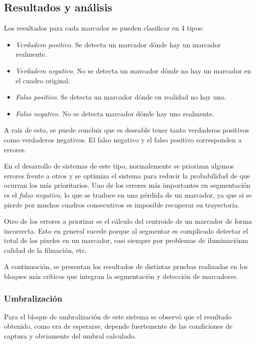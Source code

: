 \subsection{Resultados y análisis}
\label{resultadosyanalisissegmentacion}
Los resultados para cada marcador se pueden clasificar en 4 tipos:
\begin{itemize}
\item \textit{Verdadero positivo}. Se detecta un marcador dónde hay un marcador realmente.
\item \textit{Verdadero negativo}. No se detecta un marcador dónde no hay un marcador en el cuadro original.
\item \textit{Falso positivo}. Se detecta un marcador dónde en realidad no hay uno.
\item \textit{Falso negativo}. No se detecta marcador dónde hay uno realmente.
\end{itemize}


A raíz de esto, se puede concluir que es deseable tener tanto verdaderos positivos como verdaderos negativos. El falso negativo y el falso positivo corresponden a errores. 

En el desarrollo de sistemas de este tipo, normalemente se priorizan algunos errores frente a otros y se optimiza el sistema para reducir la probabilidad de que ocurran los más prioritarios. Uno de los errores más importantes en segmentación es el \textit{falso negativo}, lo que se traduce en una pérdida de un marcador, ya que si se pierde por muchos cuadros consecutivos es imposible recuperar su trayectoria. 

Otro de los errores a priorizar es el cálculo del centroide de un marcador de forma incorrecta. Esto en general sucede porque al segmentar es complicado detectar el total de los pixeles en un marcador, casi siempre por problemas de iluminaciónm calidad de la filmación, etc.

A continuación, se presentan los resultados de distintas pruebas realizadas en los bloques más críticos que integran la segmentación y detección de marcadores.

\subsubsection{Umbralización}

Para el bloque de umbralización de este sistema se observó que el resultado obtenido, como era de esperarse, depende fuertemente de las condiciones de captura y obviamente del umbral calculado. 

